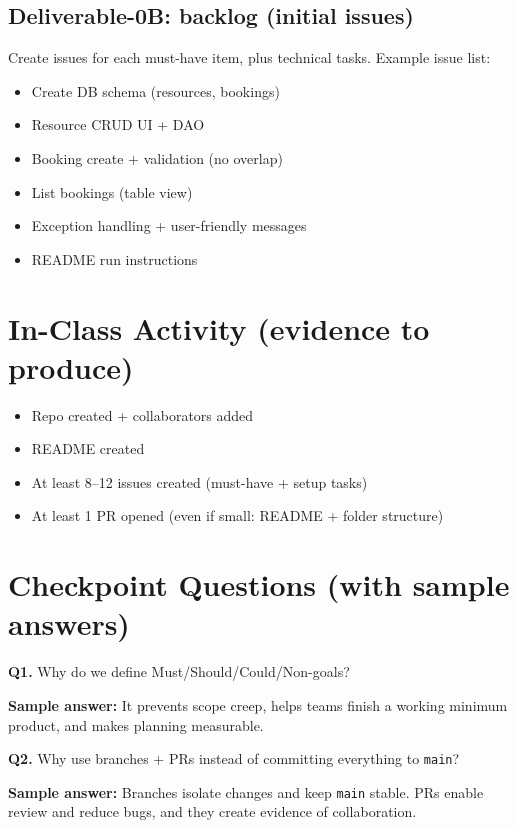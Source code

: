 \documentclass[11pt]{article}
\begin{document}
\subsection*{Deliverable-0B: backlog (initial issues)}
Create issues for each must-have item, plus technical tasks.
Example issue list:
\begin{itemize}
  \item Create DB schema (resources, bookings)
  \item Resource CRUD UI + DAO
  \item Booking create + validation (no overlap)
  \item List bookings (table view)
  \item Exception handling + user-friendly messages
  \item README run instructions
\end{itemize}
\notesources{\OOPSUnitVISources}

\section{In-Class Activity (evidence to produce)}
\begin{itemize}
  \item Repo created + collaborators added
  \item README created
  \item At least 8--12 issues created (must-have + setup tasks)
  \item At least 1 PR opened (even if small: README + folder structure)
\end{itemize}

\section{Checkpoint Questions (with sample answers)}
\textbf{Q1.} Why do we define Must/Should/Could/Non-goals?\par
\textbf{Sample answer:} It prevents scope creep, helps teams finish a working minimum product, and makes planning measurable.

\vspace{0.6em}
\textbf{Q2.} Why use branches + PRs instead of committing everything to \texttt{main}?\par
\textbf{Sample answer:} Branches isolate changes and keep \texttt{main} stable. PRs enable review and reduce bugs, and they create evidence of collaboration.
\end{document}
